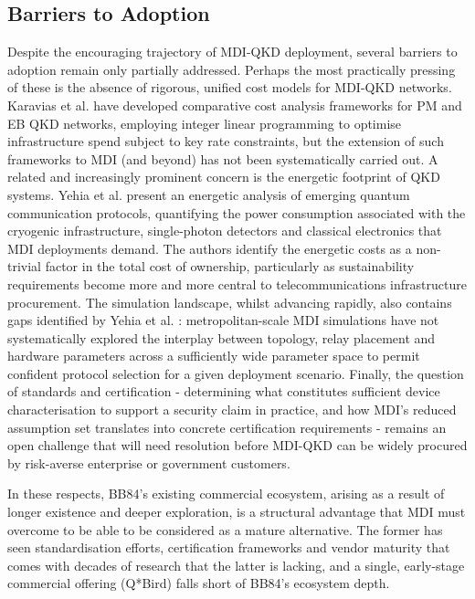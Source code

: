 \documentclass[9pt,technote]{IEEEtran}
\begin{document}
\subsection*{Barriers to Adoption}
Despite the encouraging trajectory of MDI-QKD deployment, several barriers to adoption remain only partially addressed. Perhaps the most practically pressing of these is the absence of rigorous, unified cost models for MDI-QKD networks. Karavias et al. \cite{DBLP:conf/ondm/KaraviasHBLP25} have developed comparative cost analysis frameworks for PM and EB QKD networks, employing integer linear programming to optimise infrastructure spend subject to key rate constraints, but the extension of such frameworks to MDI (and beyond) has not been systematically carried out. A related and increasingly prominent concern is the energetic footprint of QKD systems. Yehia et al. \cite{Yehia_2025} present an energetic analysis of emerging quantum communication protocols, quantifying the power consumption associated with the cryogenic infrastructure, single-photon detectors and classical electronics that MDI deployments demand. The authors identify the energetic costs as a non-trivial factor in the total cost of ownership, particularly as sustainability requirements become more and more central to telecommunications infrastructure procurement. The simulation landscape, whilst advancing rapidly, also contains gaps identified by Yehia et al. \cite{Yehia_2022}: metropolitan-scale MDI simulations have not systematically explored the interplay between topology, relay placement and hardware parameters across a sufficiently wide parameter space to permit confident protocol selection for a given deployment scenario. Finally, the question of standards and certification - determining what constitutes sufficient device characterisation to support a security claim in practice, and how MDI's reduced assumption set translates into concrete certification requirements - remains an open challenge that will need resolution before MDI-QKD can be widely procured by risk-averse enterprise or government customers.

In these respects, BB84's existing commercial ecosystem, arising as a result of longer existence and deeper exploration, is a structural advantage that MDI must overcome to be able to be considered as a mature alternative. The former has seen standardisation efforts, certification frameworks and vendor maturity that comes with decades of research that the latter is lacking, and a single, early-stage commercial offering (Q*Bird) falls short of BB84's ecosystem depth.
\end{document}
